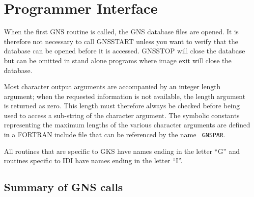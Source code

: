 \documentclass[twoside,11pt]{article}
\newcommand{\htmlref}[2]{#1}
\renewcommand{\_}{\texttt{\symbol{95}}}
\begin{document}
\newpage
\section{Programmer Interface}\label{prog}

When the first GNS routine is called, the GNS database files are opened. It is
therefore not necessary to call
\htmlref{GNS\_START}{GNS_START} unless you want to verify that
the database can be opened before it is accessed.
\htmlref{GNS\_STOP}{GNS_STOP} will close
the database but can be omitted in stand alone programs where image exit will
close the database.

Most character output arguments are accompanied by an integer length argument;
when the requested information is not available, the length argument is
returned as zero. This length must therefore always be checked before being
used to access a sub-string of the character argument. The symbolic constants
representing the maximum lengths of the various character arguments are defined
in a FORTRAN include file that can be referenced by the name {\tt
GNS\_PAR}.

All routines that are specific to GKS have names ending in the letter ``G'' and
routines specific to IDI have names ending in the letter ``I''.

\subsection{Summary of GNS calls}
\end{document}
